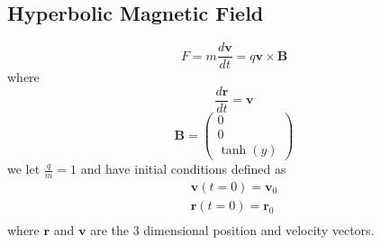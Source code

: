 \documentclass[9pt]{article}
\begin{document}
\begin{multicols}{2}
\section{Hyperbolic Magnetic Field}
    \begin{equation} 
        F=m\frac{d\mathbf{v}}{dt}=q\mathbf{v}\times\mathbf{B}
    \end{equation}
where
    \begin{equation}  
        \frac{d\mathbf{r}}{dt}=\mathbf{v}
    \end{equation}
    \begin{equation}
        \mathbf{B}=\begin{pmatrix}
            0\\0\\\tanh (y)
        \end{pmatrix}
    \end{equation}
we let $\frac{q}{m}=1$ and have initial conditions defined as 
    \begin{equation}
        \begin{split}
            \mathbf{v}(t=0)=\mathbf{v}_0\\
            \mathbf{r}(t=0)=\mathbf{r}_0\\
        \end{split}
    \end{equation}
where $\mathbf{r}$ and $\mathbf{v}$ are the 3 dimensional position and velocity vectors.

\end{multicols}
\end{document}
